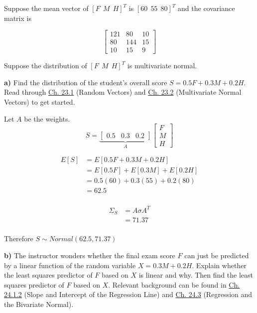 \documentclass[11pt]{article}
\begin{document}
Suppose the mean vector of \([F ~~ M ~~ H]^T\) is \([60 ~~ 55 ~~ 80]^T\)
and the covariance matrix is

\[
\begin{bmatrix}
121 & 80 & 10 \\
80 & 144 & 15 \\
10 & 15 & 9
\end{bmatrix}
\]

Suppose the distribution of \([F ~~ M ~~ H]^T\) is multivariate normal.

\textbf{a)} Find the distribution of the student's overall score
\(S = 0.5F + 0.3M + 0.2H\). Read through
\href{https://data140.org/textbook/content/chapter-23/random-vectors/}{Ch.
23.1} (Random Vectors) and
\href{https://data140.org/textbook/content/chapter-23/multivariate-normal-vectors/}{Ch.
23.2} (Multivariate Normal Vectors) to get started.

Let $A$ be the weights. 
\[
	S = \underbrace{\begin{bmatrix}
	0.5 &0.3 &0.2	
\end{bmatrix}}_{A} \begin{bmatrix}
F \\ M\\H
\end{bmatrix}
\]

\begin{align*}
E[S] &=  E[0.5F + 0.3M + 0.2H] \\
&= E[0.5F]  + E[0.3M] + E[0.2H]\\ 
&= 0.5(60) + 0.3(55) + 0.2(80) \\
&= 62.5 \\
\end{align*}


\begin{align*}
	\Sigma_{S} &= A \sigma A^{T} \\
	&= 71.37 \\
\end{align*}

Therefore $S \sim Normal(62.5, 71.37)$ 

\textbf{b)} The instructor wonders whether the final exam score \(F\)
can just be predicted by a linear function of the random variable
\(X = 0.3M + 0.2H\). Explain whether the least squares predictor of
\(F\) based on \(X\) is linear and why. Then find the least squares
predictor of \(F\) based on \(X\). Relevant background can be found in
\href{https://data140.org/textbook/content/chapter-24/linear-least-squares/\#slope-and-intercept-of-the-regression-line}{Ch.
24.1.2} (Slope and Intercept of the Regression Line) and
\href{https://data140.org/textbook/content/chapter-24/regression-and-bivariate-normal/}{Ch.
24.3} (Regression and the Bivariate Normal).
\end{document}
